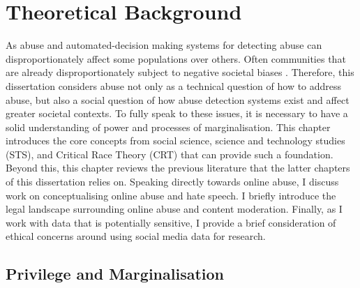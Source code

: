 

\chapter{Theoretical Background}\label{chap:socialscience}
As abuse and automated-decision making systems for detecting abuse can disproportionately affect some populations over others. 
Often communities that are already disproportionately subject to negative societal biases .
Therefore, this dissertation considers abuse not only as a technical question of how to address abuse, but also a social question of how abuse detection systems exist and affect greater societal contexts.
To fully speak to these issues, it is necessary to have a solid understanding of power and processes of marginalisation.
This chapter introduces the core concepts from social science, science and technology studies (STS), and Critical Race Theory (CRT) that can provide such a foundation. 
Beyond this, this chapter reviews the previous literature that the latter chapters of this dissertation relies on. 
Speaking directly towards online abuse, I discuss work on conceptualising online abuse and hate speech.
I briefly introduce the legal landscape surrounding online abuse and content moderation.
Finally, as I work with data that is potentially sensitive, I provide a brief consideration of ethical concerns around using social media data for research.


\section{Privilege and Marginalisation}

